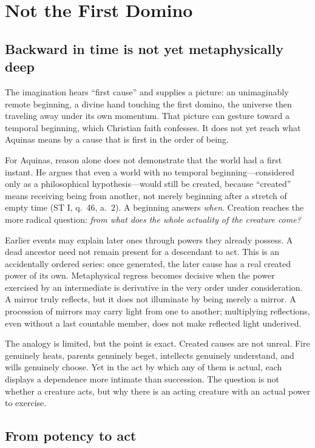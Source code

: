 \section{Not the First Domino}

\subsection{Backward in time is not yet metaphysically deep}

The imagination hears ``first cause'' and supplies a picture: an unimaginably remote beginning, a divine hand touching the first domino, the universe then traveling away under its own momentum. That picture can gesture toward a temporal beginning, which Christian faith confesses. It does not yet reach what Aquinas means by a cause that is first in the order of being.

For Aquinas, reason alone does not demonstrate that the world had a first instant. He argues that even a world with no temporal beginning---considered only as a philosophical hypothesis---would still be created, because ``created'' means receiving being from another, not merely beginning after a stretch of empty time (ST I, q.~46, a.~2). A beginning answers \emph{when}. Creation reaches the more radical question: \emph{from what does the whole actuality of the creature come?}

Earlier events may explain later ones through powers they already possess. A dead ancestor need not remain present for a descendant to act. This is an accidentally ordered series: once generated, the later cause has a real created power of its own. Metaphysical regress becomes decisive when the power exercised by an intermediate is derivative in the very order under consideration. A mirror truly reflects, but it does not illuminate by being merely a mirror. A procession of mirrors may carry light from one to another; multiplying reflections, even without a last countable member, does not make reflected light underived.

The analogy is limited, but the point is exact. Created causes are not unreal. Fire genuinely heats, parents genuinely beget, intellects genuinely understand, and wills genuinely choose. Yet in the act by which any of them is actual, each displays a dependence more intimate than succession. The question is not whether a creature acts, but why there is an acting creature with an actual power to exercise.

\subsection{From potency to act}

